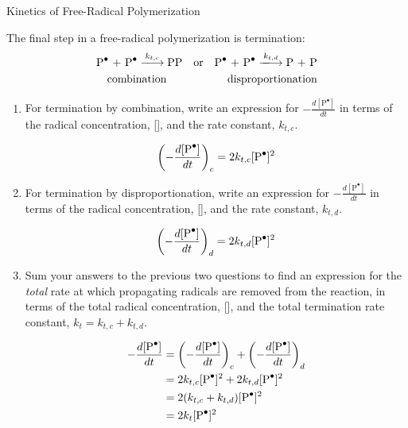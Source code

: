 \begin{activity}{Kinetics of Free-Radical Polymerization}
\begin{ctqs}
	\question The final step in a free-radical polymerization is termination:
		\begin{align*}
			\text{\ce{P^.} + \ce{P^.}} \xlongrightarrow{k_{t,c}} \text{\ce{PP}} && \text{or} && \text{\ce{P^.} + \ce{P^.}} \xlongrightarrow{k_{t,d}} \text{P + P}\\
			\text{combination\hspace{0.5cm}} && && \text{disproportionation}
		\end{align*}
		
		\begin{enumerate}
			\item For termination by combination, write an expression for $-\frac{d[\text{P}^{\bullet}]}{dt}$ in terms of the radical concentration, [], and the rate constant, $k_{t,c}$.
			
				\begin{solution}[0.75in]{}
					\begin{equation*}
						\left(-\frac{d[\text{\ce{P^.}}]}{dt}\right)_c = 2k_{t,c}[\text{\ce{P^.}}]^2
					\end{equation*}
				\end{solution}
			
			\item For termination by disproportionation, write an expression for $-\frac{d[\text{P}^{\bullet}]}{dt}$ in terms of the radical concentration, [], and the rate constant, $k_{t,d}$.
			
				\begin{solution}[0.75in]{}
					\begin{equation*}
						\left(-\frac{d[\text{\ce{P^.}}]}{dt}\right)_d = 2k_{t,d}[\text{\ce{P^.}}]^2
					\end{equation*}
				\end{solution}
			
			\item Sum your answers to the previous two questions to find an expression for the \emph{total} rate at which propagating radicals are removed from the reaction, in terms of the total radical concentration, [], and the total termination rate constant, $k_t = k_{t,c} + k_{t,d}$.
			
				\begin{solution}[0.75in]{}
					\begin{align*}
						-\frac{d[\text{\ce{P^.}}]}{dt} &= \left(-\frac{d[\text{\ce{P^.}}]}{dt}\right)_c + \left(-\frac{d[\text{\ce{P^.}}]}{dt}\right)_d\\
						&= 2k_{t,c}[\text{\ce{P^.}}]^2 + 2k_{t,d}[\text{\ce{P^.}}]^2\\
						&= 2(k_{t,c} + k_{t,d})[\text{\ce{P^.}}]^2\\
						&= 2k_t[\text{\ce{P^.}}]^2
					\end{align*}
				\end{solution}
				

\end{enumerate}
\end{ctqs}
\end{activity}
